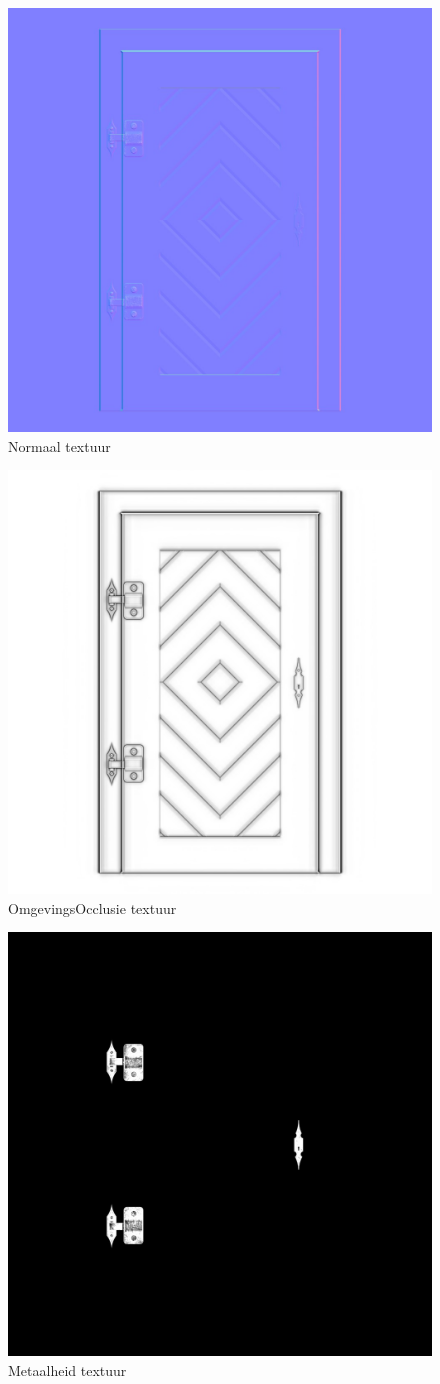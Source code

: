 \begin{figure}[]
	\centering
	\includegraphics[width=.5\linewidth]{graphics/normalTexture}
	\caption[Normaal textuur]{Normaal textuur}
	\label{fig:normalTexture}
\end{figure}
\begin{figure}[]
	\centering
	\includegraphics[width=.5\linewidth]{graphics/ambientOcclusionTexture}
	\caption[OmgevingsOcclusie textuur]{OmgevingsOcclusie textuur}
	\label{fig:ambientOcclusionTexture}
\end{figure}
\begin{figure}[]
	\centering
	\includegraphics[width=.5\linewidth]{graphics/metalnessTexture}
	\caption[Metaalheid textuur]{Metaalheid textuur}
	\label{fig:metalnessTexture}
\end{figure}
